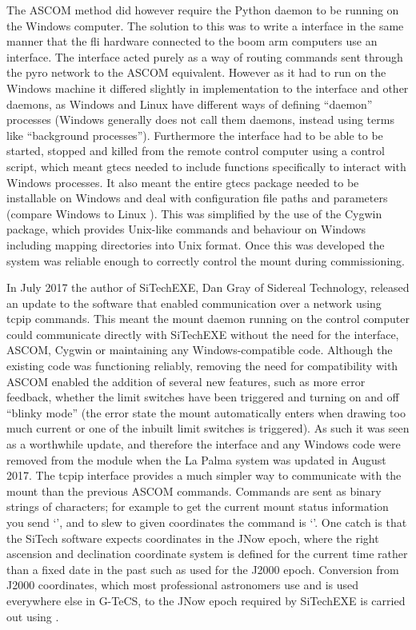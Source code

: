 \begin{colsection}
\begin{colsection}
The ASCOM method did however require the Python daemon to be running on the Windows computer. The solution to this was to write a  interface in the same manner that the \gls{fli} hardware connected to the boom arm computers use an  interface. The  interface acted purely as a way of routing commands sent through the \gls{pyro} network to the ASCOM equivalent. However as it had to run on the Windows machine it differed slightly in implementation to the  interface and other daemons, as Windows and Linux have different ways of defining ``daemon'' processes (Windows generally does not call them daemons, instead using terms like ``background processes''). Furthermore the interface had to be able to be started, stopped and killed from the remote control computer using a  control script, which meant \gls{gtecs} needed to include functions specifically to interact with Windows processes. It also meant the entire \gls{gtecs} package needed to be installable on Windows and deal with configuration file paths and parameters (compare Windows  to Linux ). This was simplified by the use of the Cygwin package, which provides Unix-like commands and behaviour on Windows including mapping directories into Unix format. Once this was developed the system was reliable enough to correctly control the mount during commissioning.

In July 2017 the author of SiTechEXE, Dan Gray of Sidereal Technology, released an update to the software that enabled communication over a network using \gls{tcpip} commands. This meant the mount daemon running on the control computer could communicate directly with SiTechEXE without the need for the  interface, ASCOM, Cygwin or maintaining any Windows-compatible code. Although the existing code was functioning reliably, removing the need for compatibility with ASCOM enabled the addition of several new features, such as more error feedback, whether the limit switches have been triggered and turning on and off ``blinky mode'' (the error state the mount automatically enters when drawing too much current or one of the inbuilt limit switches is triggered). As such it was seen as a worthwhile update, and therefore the  interface and any Windows code were removed from the  module when the La Palma system was updated in August 2017. The \gls{tcpip} interface provides a much simpler way to communicate with the mount than the previous ASCOM commands. Commands are sent as binary strings of characters; for example to get the current mount status information you send `', and to slew to given coordinates the command is `'. One catch is that the SiTech software expects coordinates in the JNow epoch, where the right ascension and declination coordinate system is defined for the current time rather than a fixed date in the past such as used for the J2000 epoch. Conversion from J2000 coordinates, which most professional astronomers use and is used everywhere else in G-TeCS, to the JNow epoch required by SiTechEXE is carried out using .


\end{colsection}
\end{colsection}
